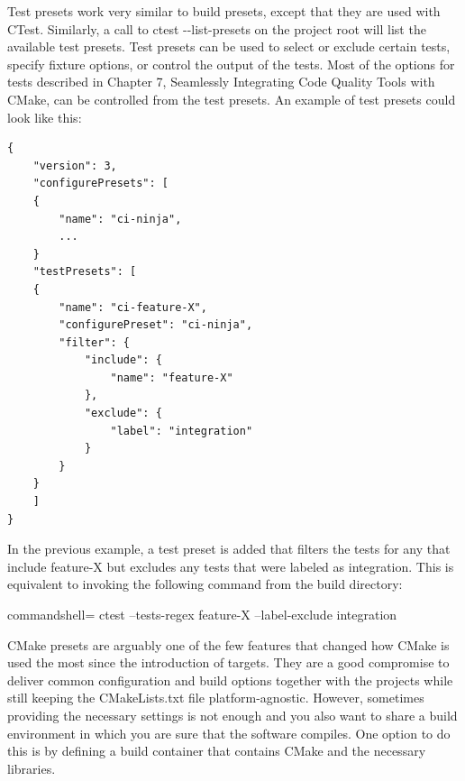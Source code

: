 Test presets work very similar to build presets, except that they are used with CTest. Similarly, a call to ctest -{}-list-presets on the project root will list the available test presets. Test presets can be used to select or exclude certain tests, specify fixture options, or control the output of the tests. Most of the options for tests described in Chapter 7, Seamlessly Integrating Code Quality Tools with CMake, can be controlled from the test presets. An example of test presets could look like this:

\begin{lstlisting}[style=styleCMake]
{
	"version": 3,
	"configurePresets": [
	{
		"name": "ci-ninja",
		...
	}
	"testPresets": [
	{
		"name": "ci-feature-X",
		"configurePreset": "ci-ninja",
		"filter": {
			"include": {
				"name": "feature-X"
			},
			"exclude": {
				"label": "integration"
			}
		}
	}
	]
}
\end{lstlisting}

In the previous example, a test preset is added that filters the tests for any that include feature-X but excludes any tests that were labeled as integration. This is equivalent to invoking the following command from the build directory:

\begin{tcblisting}{commandshell={}}
ctest --tests-regex feature-X --label-exclude integration
\end{tcblisting}

CMake presets are arguably one of the few features that changed how CMake is used the most since the introduction of targets. They are a good compromise to deliver common configuration and build options together with the projects while still keeping the CMakeLists.txt file platform-agnostic. However, sometimes providing the necessary settings is not enough and you also want to share a build environment in which you are sure that the software compiles. One option to do this is by defining a build container that contains CMake and the necessary libraries.















